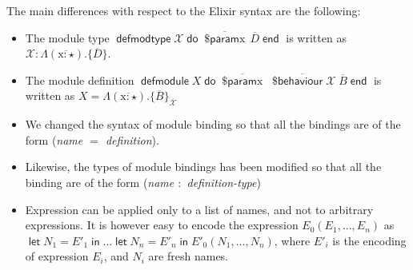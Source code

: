 \documentclass[a4paper,10pt]{article}
\DeclareMathOperator{\kwdefmt}{\textsf{defmodtype}}
\DeclareMathOperator{\kwend}{\textsf{end}}
\DeclareMathOperator{\kwdo}{\textsf{do}}
\DeclareMathOperator{\kwbvr}{\textsf{\$behaviour}}
\DeclareMathOperator{\kwlet}{\textsf{let}}
\DeclareMathOperator{\kwin}{\textsf{in}}
\DeclareMathOperator{\kwprm}{\textsf{\$param}}
\DeclareMathOperator{\kwdefm}{\textsf{defmodule}}
\newcommand{\tx}{\textrm{x}}
\begin{document}
The main differences with respect to the Elixir syntax are the following:

\begin{itemize}
  \item The module type $\kwdefmt \mathcal X \kwdo \overline{\kwprm \tx}\, \overline{D} \kwend$ is written as $\mathcal X : \Lambda(\overline{\tx:\star}).\{\overline{D}\}$.
  \item The module definition $\kwdefm X \kwdo \overline{\kwprm \tx}\; \overline{\kwbvr \mathcal{X}}\; \overline{B} \kwend$ is written as $X = \Lambda(\overline{\tx:\star}).\{\overline{B}\}_{\overline{\mathcal{X}}}$
  \item We changed the syntax of module binding so that all the bindings are of the form (\emph{name $=$ definition}).
  \item Likewise, the types of module bindings has been modified so that all the binding are of the form (\emph{name $:$ definition-type})
  \item Expression can be applied only to a list of names, and not to arbitrary expressions. It is however easy to encode the expression $E_0(E_1,...,E_n)$ as $\kwlet N_1 = E'_1 \kwin ... \kwlet N_n=E'_n\kwin E'_0(N_1,\dots,N_n)$, where $E'_i$ is the encoding of expression $E_i$, and $N_i$ are fresh names.  
\end{itemize}
\end{document}

